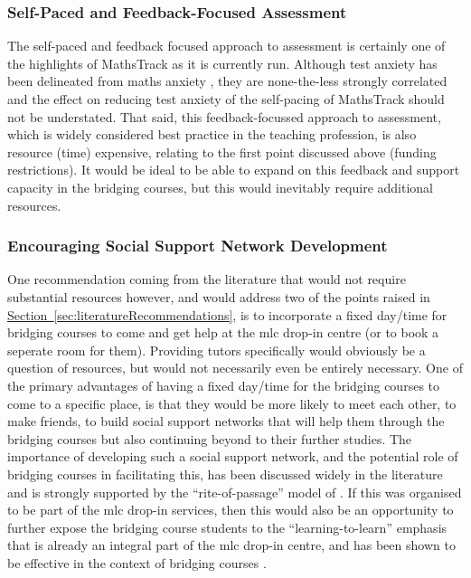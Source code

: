 \documentclass[twoside,12pt,a4paper]{report}
\newcommand{\refsec}[1]{\hyperref[sec:#1]{Section~\ref{sec:#1}}}
\begin{document}
\subsubsection{Self-Paced and Feedback-Focused Assessment}

The self-paced and feedback focused approach to assessment is certainly one of the highlights of MathsTrack as it is currently run. Although test anxiety has been delineated from maths anxiety \cite{Kazelskis2000}, they are none-the-less strongly correlated and the effect on reducing test anxiety of the self-pacing of MathsTrack should not be understated. That said, this feedback-focussed approach to assessment, which is widely considered best practice in the teaching profession, is also resource (time) expensive, relating to the first point discussed above (funding restrictions). It would be ideal to be able to expand on this feedback and support capacity in the bridging courses, but this would inevitably require additional resources.

\subsubsection{Encouraging Social Support Network Development}

One recommendation coming from the literature that would not require substantial resources however, and would address two of the points raised in \refsec{literatureRecommendations}, is to incorporate a fixed day/time for bridging courses to come and get help at the \gls{mlc} drop-in centre (or to book a seperate room for them). Providing tutors specifically would obviously be a question of resources, but would not necessarily even be entirely necessary. One of the primary advantages of having a fixed day/time for the bridging courses to come to a specific place, is that they would be more likely to meet each other, to make friends, to build social support networks that will help them through the bridging courses but also continuing beyond to their further studies. The importance of developing such a social support network, and the potential role of bridging courses in facilitating this, has been discussed widely in the literature \cite{Trotter2006, Peat2001, Leese2010, Gordon2013} and is strongly supported by the ``rite-of-passage'' model of . If this was organised to be part of the \gls{mlc} drop-in services, then this would also be an opportunity to further expose the bridging course students to the ``learning-to-learn'' emphasis that is already an integral part of the \gls{mlc} drop-in centre, and has been shown to be effective in the context of bridging courses \cite{Zeegers2001}.
\end{document}
